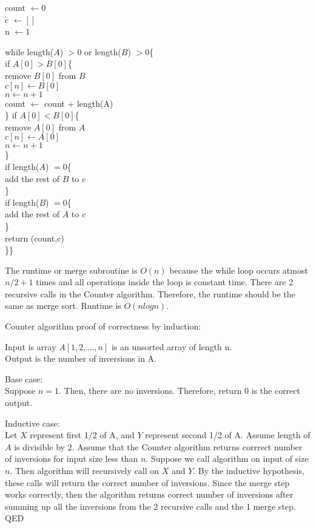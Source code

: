 \documentclass[11pt]{article}
\begin{document}
count \(\leftarrow 0\)\\
c \(\leftarrow []\)\\
n \(\leftarrow 1\)

while length(\(A\)) \(>0\) or length(\(B\)) \(>0\)\{\\
if \(A[0] > B[0]\)\{\\
remove \(B[0]\) from \(B\)\\
\(c[n] \leftarrow B[0]\)\\
\(n \leftarrow n+1\)\\
count \(\leftarrow\) count \(+\) length(A)\\
\} if \(A[0] < B[0]\)\{\\
remove \(A[0]\) from \(A\)\\
\(c[n] \leftarrow A[0]\)\\
\(n \leftarrow n+1\)\\
\}\\
if length(\(A\)) \(=0\)\{\\
add the rest of \(B\) to \(c\)\\
\}\\
if length(\(B\)) \(=0\)\{\\
add the rest of \(A\) to \(c\)\\
\}\\
return (count,c)\\
\}\}

    The runtime or merge subroutine is \(O(n)\) because the while loop
occurs atmost \(n/2+1\) times and all operations inside the loop is
constant time. There are 2 recursive calls in the Counter algorithm.
Therefore, the runtime should be the same as merge sort. Runtime is
\(O(nlogn)\).

    Counter algorithm proof of correctness by induction:

Input is array \(A[1, 2, ..., n]\) is an unsorted array of length n.\\
Output is the number of inversions in A.

Base case:\\
Suppose \(n=1\). Then, there are no inversions. Therefore, return 0 is
the correct output.

Inductive case:\\
Let \(X\) represent first 1/2 of A, and \(Y\) represent second 1/2 of A.
Assume length of \(A\) is divisible by 2. Assume that the Counter
algorithm returns corrrect number of inversions for input size less than
\(n\). Suppose we call algorithm on input of size \(n\). Then algorithm
will recursively call on \(X\) and \(Y\). By the inductive hypothesis,
these calls will return the correct number of inversions. Since the
merge step works correctly, then the algorithm returns correct number of
inversions after summing up all the inversions from the 2 recursive
calls and the 1 merge step. QED
\end{document}
